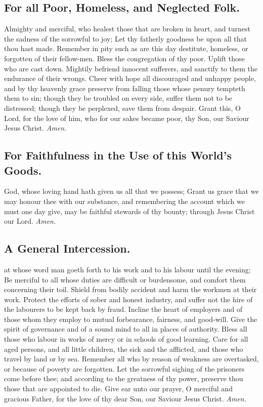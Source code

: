 \subsection{For all Poor, Homeless, and Neglected Folk.}
 Almighty and merciful, who healest those that are broken in heart, and turnest the sadness of the sorrowful to joy; Let thy fatherly goodness be upon all that thou hast made. Remember in pity such as are this day destitute, homeless, or forgotten of their fellow-men. Bless the congregation of thy poor. Uplift those who are cast down. Mightily befriend innocent sufferers, and sanctify to them the endurance of their wrongs. Cheer with hope all discouraged and unhappy people, and by thy heavenly grace preserve from falling those whose penury tempteth them to sin; though they be troubled on every side, suffer them not to be distressed; though they be perplexed, save them from despair. Grant this, O Lord, for the love of him, who for our sakes became poor, thy Son, our Saviour Jesus Christ. \textit{Amen.}

\subsection{For Faithfulness in the Use of this World's Goods.}
 God, whose loving hand hath given us all that we possess; Grant us grace that we may honour thee with our substance, and remembering the account which we must one day give, may be faithful stewards of thy bounty; through Jesus Christ our Lord. \textit{Amen.}

\subsection{A General Intercession.}
 at whose word man goeth forth to his work and to his labour until the evening; Be merciful to all whose duties are difficult or burdensome, and comfort them concerning their toil. Shield from bodily accident and harm the workmen at their work. Protect the efforts of sober and honest industry, and suffer not the hire of the labourers to be kept back by fraud. Incline the heart of employers and of those whom they employ to mutual forbearance, fairness, and good-will. Give the spirit of governance and of a sound mind to all in places of authority. Bless all those who labour in works of mercy or in schools of good learning. Care for all aged persons, and all little children, the sick and the afflicted, and those who travel by land or by sea. Remember all who by reason of weakness are overtasked, or because of poverty are forgotten. Let the sorrowful sighing of the prisoners come before thee; and according to the greatness of thy power, preserve thou those that are appointed to die. Give ear unto our prayer, O merciful and gracious Father, for the love of thy dear Son, our Saviour Jesus Christ. \textit{Amen.}

